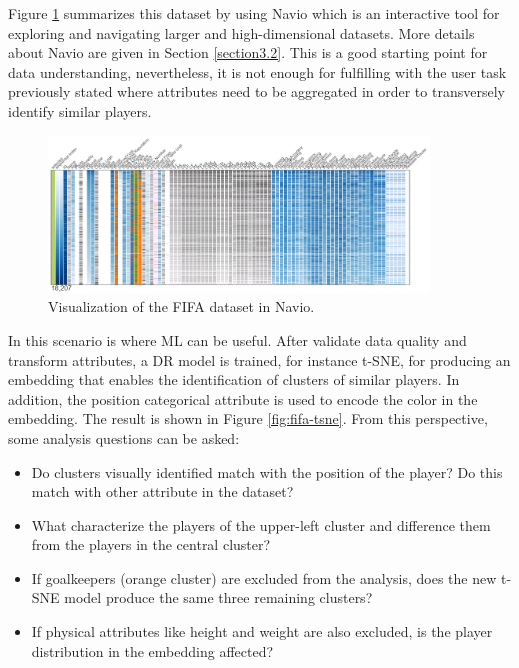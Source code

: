 Figure \ref{fig:fifa-navio} summarizes this dataset by using Navio \cite{Guerra-Gomez2018Navio:Datasets} which is an interactive tool for exploring and navigating larger and high-dimensional datasets. More details about Navio are given in Section \ref{section3.2}. This is a good starting point for data understanding, nevertheless, it is not enough for fulfilling with the user task previously stated where attributes need to be aggregated in order to transversely identify similar players. 

\begin{figure}[ht]
 \centering
 \includegraphics[width=0.9\textwidth]{fifa-navio.png}
 \caption{Visualization of the FIFA dataset in Navio.}
 \label{fig:fifa-navio}
\end{figure}

In this scenario is where ML can be useful. After validate data quality and transform attributes, a DR model is trained, for instance t-SNE, for producing an embedding that enables the identification of clusters of similar players. In addition, the position categorical attribute is used to encode the color in the embedding. The result is shown in Figure \ref{fig:fifa-tsne}. From this perspective, some analysis questions can be asked:

\begin{itemize}
\item Do clusters visually identified match with the position of the player? Do this match with other attribute in the dataset?
\item What characterize the players of the upper-left cluster and difference them from the players in the central cluster?
\item If goalkeepers (orange cluster) are excluded from the analysis, does the new t-SNE model produce the same three remaining clusters?
\item If physical attributes like height and weight are also excluded, is the player distribution in the embedding affected?  
\end{itemize}

